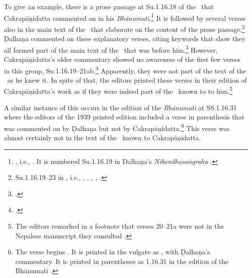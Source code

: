 To give an example, there is a prose passage at Su.1.16.18 of the \SS\ that
Cakrapāṇidatta commented on in his
\emph{Bhānumatī}.\footnote{\cite[130]{acar-1939}, i.e.,
. It is numbered
Su.1.16.19 in Dalhaṇa's \emph{Nibandhasaṅgraha} \citep[79]{vulgate}.} It is
followed by several verses also in the main text  of the \SS\ that elaborate on
the content of the prose passage.\footnote{Su.1.16.19--23 in \cite{acar-1939},
i.e., , , , , .} 
%
Ḍalhaṇa commented on these explanatory verses, citing keywords that show they all
formed part of the main text of the \SS\ that was before
him.\footnote{.} However, Cakrapāṇidatta's older
commentary showed no awareness of the first few verses in this group,
Su.1.16.19--21ab.\footcite[130--131]{acar-1939}  Apparently, they were not part of
the text of the \SS\ as he knew it.  In spite of that, the editors printed these
verses in their edition of Cakrapāṇidatta's work as if they were indeed part of
the \SS\ known to to him.\footnote{The editors remarked in a footnote that verses
20--21a were not in the Nepalese manuscript they consulted \citep[130,
n.\,2]{acar-1939}.}

A similar instance of this occurs in the edition of the \emph{Bhānumatī} at SS.1.16.31 
where the editors of the 1939 printed edition included a verse in parenthesis that was
commented on by Ḍalhaṇa but not by Cakrapāṇidatta.\footnote{The verse begins 
.  It is printed in the vulgate as 
, with Ḍalhaṇa's commentary.  It is printed in parentheses as 1.16.31 in the 
edition of the Bhānumatī \citep[133]{acar-1939}.} This verse was almost certainly not in the 
text of the \SS\ known to Cakrapāṇidatta. 

